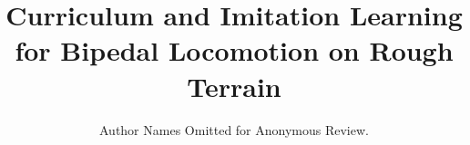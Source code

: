 \documentclass[conference]{IEEEtran}
\begin{document}
\title{Curriculum and Imitation Learning for Bipedal Locomotion on Rough Terrain}

\author{Author Names Omitted for Anonymous Review.}





% 


\maketitle
\end{document}
